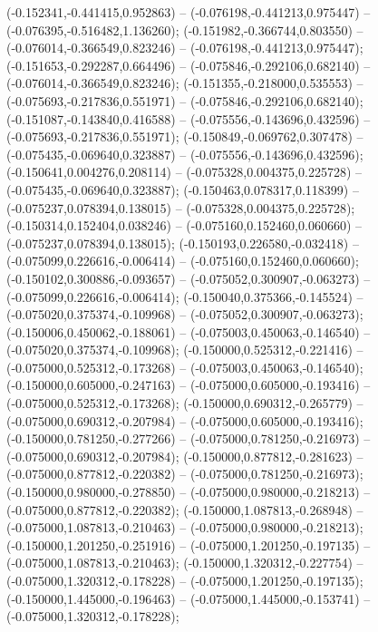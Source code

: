  (-0.152341,-0.441415,0.952863) -- (-0.076198,-0.441213,0.975447) -- (-0.076395,-0.516482,1.136260);
 (-0.151982,-0.366744,0.803550) -- (-0.076014,-0.366549,0.823246) -- (-0.076198,-0.441213,0.975447);
 (-0.151653,-0.292287,0.664496) -- (-0.075846,-0.292106,0.682140) -- (-0.076014,-0.366549,0.823246);
 (-0.151355,-0.218000,0.535553) -- (-0.075693,-0.217836,0.551971) -- (-0.075846,-0.292106,0.682140);
 (-0.151087,-0.143840,0.416588) -- (-0.075556,-0.143696,0.432596) -- (-0.075693,-0.217836,0.551971);
 (-0.150849,-0.069762,0.307478) -- (-0.075435,-0.069640,0.323887) -- (-0.075556,-0.143696,0.432596);
 (-0.150641,0.004276,0.208114) -- (-0.075328,0.004375,0.225728) -- (-0.075435,-0.069640,0.323887);
 (-0.150463,0.078317,0.118399) -- (-0.075237,0.078394,0.138015) -- (-0.075328,0.004375,0.225728);
 (-0.150314,0.152404,0.038246) -- (-0.075160,0.152460,0.060660) -- (-0.075237,0.078394,0.138015);
 (-0.150193,0.226580,-0.032418) -- (-0.075099,0.226616,-0.006414) -- (-0.075160,0.152460,0.060660);
 (-0.150102,0.300886,-0.093657) -- (-0.075052,0.300907,-0.063273) -- (-0.075099,0.226616,-0.006414);
 (-0.150040,0.375366,-0.145524) -- (-0.075020,0.375374,-0.109968) -- (-0.075052,0.300907,-0.063273);
 (-0.150006,0.450062,-0.188061) -- (-0.075003,0.450063,-0.146540) -- (-0.075020,0.375374,-0.109968);
 (-0.150000,0.525312,-0.221416) -- (-0.075000,0.525312,-0.173268) -- (-0.075003,0.450063,-0.146540);
 (-0.150000,0.605000,-0.247163) -- (-0.075000,0.605000,-0.193416) -- (-0.075000,0.525312,-0.173268);
 (-0.150000,0.690312,-0.265779) -- (-0.075000,0.690312,-0.207984) -- (-0.075000,0.605000,-0.193416);
 (-0.150000,0.781250,-0.277266) -- (-0.075000,0.781250,-0.216973) -- (-0.075000,0.690312,-0.207984);
 (-0.150000,0.877812,-0.281623) -- (-0.075000,0.877812,-0.220382) -- (-0.075000,0.781250,-0.216973);
 (-0.150000,0.980000,-0.278850) -- (-0.075000,0.980000,-0.218213) -- (-0.075000,0.877812,-0.220382);
 (-0.150000,1.087813,-0.268948) -- (-0.075000,1.087813,-0.210463) -- (-0.075000,0.980000,-0.218213);
 (-0.150000,1.201250,-0.251916) -- (-0.075000,1.201250,-0.197135) -- (-0.075000,1.087813,-0.210463);
 (-0.150000,1.320312,-0.227754) -- (-0.075000,1.320312,-0.178228) -- (-0.075000,1.201250,-0.197135);
 (-0.150000,1.445000,-0.196463) -- (-0.075000,1.445000,-0.153741) -- (-0.075000,1.320312,-0.178228);
